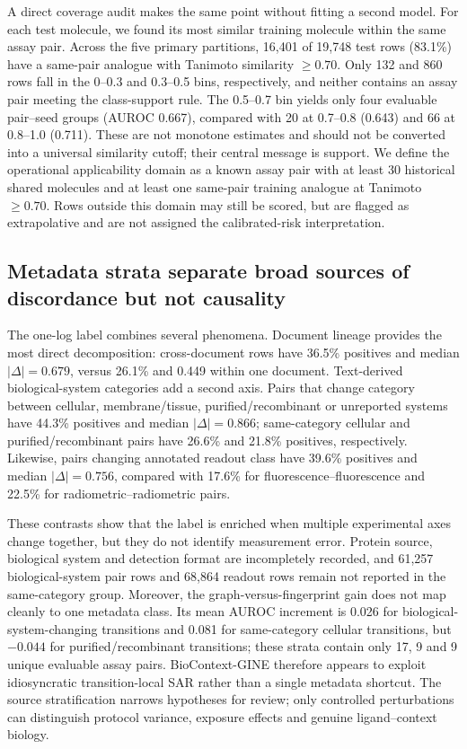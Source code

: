 \documentclass[letterpaper]{article}
\begin{document}
A direct coverage audit makes the same point without fitting a second model. For each test molecule, we found its most similar training molecule within the same assay pair. Across the five primary partitions, 16,401 of 19,748 test rows (83.1\%) have a same-pair analogue with Tanimoto similarity $\geq0.70$. Only 132 and 860 rows fall in the 0--0.3 and 0.3--0.5 bins, respectively, and neither contains an assay pair meeting the class-support rule. The 0.5--0.7 bin yields only four evaluable pair--seed groups (AUROC 0.667), compared with 20 at 0.7--0.8 (0.643) and 66 at 0.8--1.0 (0.711). These are not monotone estimates and should not be converted into a universal similarity cutoff; their central message is support. We define the operational applicability domain as a known assay pair with at least 30 historical shared molecules and at least one same-pair training analogue at Tanimoto $\geq0.70$. Rows outside this domain may still be scored, but are flagged as extrapolative and are not assigned the calibrated-risk interpretation.

\subsection{Metadata strata separate broad sources of discordance but not causality}

The one-log label combines several phenomena. Document lineage provides the most direct decomposition: cross-document rows have 36.5\% positives and median $|\Delta|=0.679$, versus 26.1\% and 0.449 within one document. Text-derived biological-system categories add a second axis. Pairs that change category between cellular, membrane/tissue, purified/recombinant or unreported systems have 44.3\% positives and median $|\Delta|=0.866$; same-category cellular and purified/recombinant pairs have 26.6\% and 21.8\% positives, respectively. Likewise, pairs changing annotated readout class have 39.6\% positives and median $|\Delta|=0.756$, compared with 17.6\% for fluorescence--fluorescence and 22.5\% for radiometric--radiometric pairs.

These contrasts show that the label is enriched when multiple experimental axes change together, but they do not identify measurement error. Protein source, biological system and detection format are incompletely recorded, and 61,257 biological-system pair rows and 68,864 readout rows remain not reported in the same-category group. Moreover, the graph-versus-fingerprint gain does not map cleanly to one metadata class. Its mean AUROC increment is 0.026 for biological-system-changing transitions and 0.081 for same-category cellular transitions, but $-0.044$ for purified/recombinant transitions; these strata contain only 17, 9 and 9 unique evaluable assay pairs. BioContext-GINE therefore appears to exploit idiosyncratic transition-local SAR rather than a single metadata shortcut. The source stratification narrows hypotheses for review; only controlled perturbations can distinguish protocol variance, exposure effects and genuine ligand--context biology.
\end{document}
